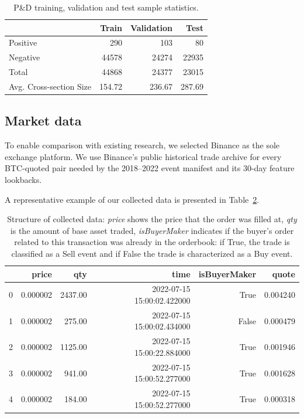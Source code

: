 \documentclass{ieeeaccess}
\begin{document}
\begin{table}[!tbp]
    \centering
    \small
    \setlength{\tabcolsep}{5pt}
    \renewcommand{\arraystretch}{1.15}
    \caption{P\&D training, validation and test sample statistics.}
    \begin{tabular}{lrrr}
        \toprule
         & Train & Validation & Test \\
        \midrule
        Positive & 290 & 103 & 80 \\
        Negative & 44578 & 24274 & 22935 \\
        Total & 44868 & 24377 & 23015 \\
        Avg. Cross-section Size & 154.72 & 236.67 & 287.69 \\
        \bottomrule
    \end{tabular}
    \label{table:train_val_test_stats}
\end{table}

\subsection{Market data}

To enable comparison with existing research, we selected Binance as the sole exchange platform. We use Binance's public historical trade archive for every BTC-quoted pair needed by the 2018--2022 event manifest and its 30-day feature lookbacks.

A representative example of our collected data is presented in Table~\ref{table:collected_tick_data}.

\begin{table}[!tbp]
    \centering
    \begin{tabular}{lrrrrr}
        \toprule
         & price & qty & time & isBuyerMaker & quote \\
        \midrule
        0 & 0.000002 & 2437.00 & 2022-07-15 15:00:02.422000 & True & 0.004240 \\
        1 & 0.000002 & 275.00& 2022-07-15 15:00:02.434000 & False & 0.000479 \\
        2 & 0.000002 & 1125.00 & 2022-07-15 15:00:22.884000 & True & 0.001946 \\
        3 & 0.000002 & 941.00 & 2022-07-15 15:00:52.277000 & True & 0.001628 \\
        4 & 0.000002 & 184.00 & 2022-07-15 15:00:52.277000 & True & 0.000318 \\
        \bottomrule
    \end{tabular}
    \caption{Structure of collected data: \textit{price} shows the price that the order was filled at, \textit{qty} is the amount of base asset traded, \textit{isBuyerMaker} indicates if the buyer's order related to this transaction was already in the orderbook: if True, the trade is classified as a Sell event and if False the trade is characterized as a Buy event.}
    \label{table:collected_tick_data}
\end{table}
\end{document}
